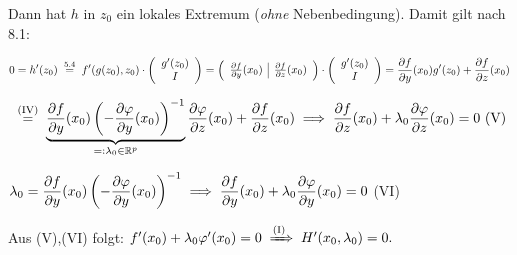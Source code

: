 \documentclass[a4paper,oneside,DIV15,BCOR12mm,chapterprefix=true,headings=onelinechapter]{scrbook}
\begin{document}
\begin{beweis}
Dann hat $h$ in $z_0$ ein lokales Extremum (\emph{ohne} Nebenbedingung). Damit gilt nach 8.1:

$$0=h'(z_0) \gleichnach{5.4} f'(g(z_0),z_0)\cdot\left(
\begin{array}{c}
g'(z_0)\\
I
\end{array}\right) = \left(
\begin{array}{c|c}
\frac{\partial f}{\partial y}(x_0) & \frac{\partial f}{\partial z}(x_0)
\end{array}\right) \cdot \left(
\begin{array}{c}
g'(z_0)\\
I
\end{array}\right) = \frac{\partial f}{\partial y}(x_0) g'(z_0) + \frac{\partial f}{\partial z}(x_0)$$

$$\gleichnach{(IV)} \underbrace{\frac{\partial f}{\partial y}(x_0) \left(-\frac{\partial \varphi}{\partial y}(x_0)\right)^{-1}}_{=: \lambda_0 \in \MdR^p} \frac{\partial \varphi}{\partial z}(x_0) + \frac{\partial f}{\partial z}(x_0) \folgt \frac{\partial f}{\partial z}(x_0) + \lambda_0 \frac{\partial \varphi}{\partial z}(x_0) = 0\text{ (V)}$$

$\displaystyle{\lambda_0 = \frac{\partial f}{\partial y}(x_0) \left(-\frac{\partial \varphi}{\partial y}(x_0)\right)^{-1} \ensuremath{\implies}\frac{\partial f}{\partial y}(x_0) + \lambda_0 \frac{\partial \varphi}{\partial y}(x_0) = 0}$ (VI)

Aus (V),(VI) folgt: $f'(x_0) + \lambda_0\varphi'(x_0) = 0 \folgtnach{(I)} H'(x_0,\lambda_0) = 0.$

\end{beweis}
\end{document}
